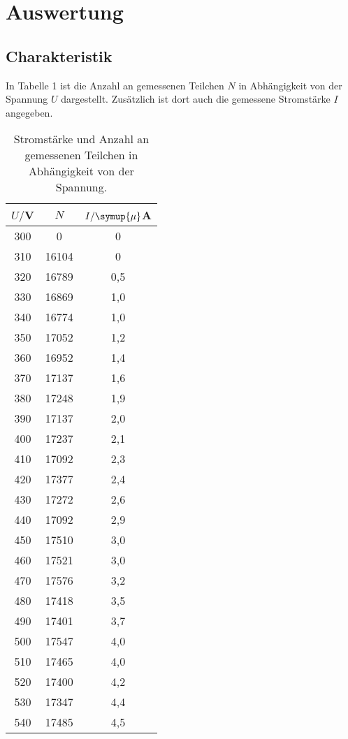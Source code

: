 \section{Auswertung}
\label{sec:Auswertung}

\subsection{Charakteristik}
In Tabelle 1 ist die Anzahl an gemessenen Teilchen $N$ in Abhängigkeit von der Spannung  $U$ dargestellt. Zusätzlich
ist dort auch die gemessene Stromstärke $I$ angegeben.

\begin{table}[H]
  \centering
  \caption{Stromstärke und Anzahl an gemessenen Teilchen in Abhängigkeit von der Spannung.}
  \label{tab:Rechteckspannung}
  \begin{tabular}{c c c}
    \toprule
    $U/$V & $N$ & $I/\symup{\mu}$A \\
    \midrule
    300 &	0	    & 0  \\
    310 &	16104 &	0  \\
    320 &	16789 &	0,5 \\
    330 &	16869 &	1,0 \\
    340 &	16774 &	1,0 \\
    350 &	17052 &	1,2 \\
    360 &	16952 &	1,4 \\
    370 &	17137 &	1,6 \\
    380 &	17248 &	1,9 \\
    390 &	17137 &	2,0 \\
    400 &	17237 &	2,1 \\
    410 &	17092 &	2,3 \\
    420 &	17377 &	2,4 \\
    430 &	17272 &	2,6 \\
    440 &	17092 &	2,9 \\
    450 &	17510 &	3,0 \\
    460 &	17521 &	3,0 \\
    470 &	17576 &	3,2 \\
    480 &	17418 &	3,5 \\
    490 &	17401 &	3,7 \\
    500 &	17547 &	4,0 \\
    510 &	17465 &	4,0 \\
    520 &	17400 &	4,2 \\
    530 &	17347 &	4,4 \\
    540 &	17485 &	4,5 \\

\end{tabular}
\end{table}
